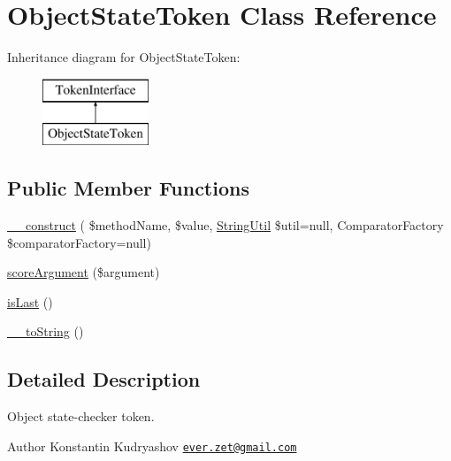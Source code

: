 \hypertarget{class_prophecy_1_1_argument_1_1_token_1_1_object_state_token}{}\section{Object\+State\+Token Class Reference}
\label{class_prophecy_1_1_argument_1_1_token_1_1_object_state_token}
Inheritance diagram for Object\+State\+Token\+:\begin{figure}[H]
\begin{center}
\leavevmode
\includegraphics[height=2.000000cm]{class_prophecy_1_1_argument_1_1_token_1_1_object_state_token}
\end{center}
\end{figure}
\subsection*{Public Member Functions}
\begin{DoxyCompactItemize}
\item 
\mbox{\hyperlink{class_prophecy_1_1_argument_1_1_token_1_1_object_state_token_ae367e30ec0df8710f0a94a48797797d7}{\+\_\+\+\_\+construct}} ( \$method\+Name, \$value, \mbox{\hyperlink{class_prophecy_1_1_util_1_1_string_util}{String\+Util}} \$util=null, Comparator\+Factory \$comparator\+Factory=null)
\item 
\mbox{\hyperlink{class_prophecy_1_1_argument_1_1_token_1_1_object_state_token_a8d5bf47ab6eaa935458d5ad160e52822}{score\+Argument}} (\$argument)
\item 
\mbox{\hyperlink{class_prophecy_1_1_argument_1_1_token_1_1_object_state_token_ac72b8349b1340887fc1af30eca2b951c}{is\+Last}} ()
\item 
\mbox{\hyperlink{class_prophecy_1_1_argument_1_1_token_1_1_object_state_token_a7516ca30af0db3cdbf9a7739b48ce91d}{\+\_\+\+\_\+to\+String}} ()
\end{DoxyCompactItemize}


\subsection{Detailed Description}
Object state-\/checker token.

\begin{DoxyAuthor}{Author}
Konstantin Kudryashov \href{mailto:ever.zet@gmail.com}{\tt ever.\+zet@gmail.\+com} 
\end{DoxyAuthor}


